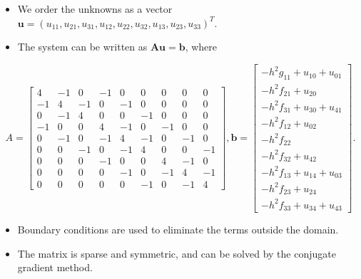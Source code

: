 \documentclass{beamer}
\newcommand{\afterverb}{\normalsize}
\begin{document}
\begin{frame}
\begin{itemize}
     \item We order the unknowns as a vector $\mathbf{u}=(u_{11}, u_{21}, u_{31}, u_{12}, u_{22}, u_{32}, u_{13}, u_{23}, u_{33})^T$.
     \item The system can be written as $\mathbf{A} \mathbf{u} = \mathbf{b}$,
    where 
\end{itemize}
    \scriptsize
    \[
        A=\left[\begin{array}{rrrrrrrrr}
            4 & -1 & 0 & -1 & 0 & 0 & 0 & 0 & 0 \\
            -1 & 4 & -1 & 0 & -1 & 0 & 0 & 0 & 0 \\
            0 & -1 & 4 & 0 & 0 & -1 & 0 & 0 & 0 \\
            -1 & 0 & 0 & 4 & -1 & 0 & -1 & 0 & 0 \\
            0 & -1 & 0 & -1 & 4 & -1 & 0 & -1 & 0 \\
            0 & 0 & -1 & 0 & -1 & 4 & 0 & 0 & -1 \\
            0 & 0 & 0 & -1 & 0 & 0 & 4 & -1 & 0 \\
            0 & 0 & 0 & 0 & -1 & 0 & -1 & 4 & -1 \\
            0 & 0 & 0 & 0 & 0 & -1 & 0 & -1 & 4
            \end{array}\right],         
            \boldsymbol{b}=\left[\begin{array}{l}
                -h^2 g_{11}+u_{10}+u_{01} \\
                -h^2 f_{21}+u_{20} \\
                -h^2 f_{31}+u_{30}+u_{41} \\
                -h^2 f_{12}+u_{02} \\
                -h^2 f_{22} \\
                -h^2 f_{32}+u_{42} \\
                -h^2 f_{13}+u_{14}+u_{03} \\
                -h^2 f_{23}+u_{24} \\
                -h^2 f_{33}+u_{34}+u_{43}
                \end{array}\right].
    \]
    \afterverb
    \begin{itemize}
        \item Boundary conditions are used to eliminate the terms outside the domain.
        \item The matrix is sparse and symmetric, and can be solved by the conjugate gradient method.
    \end{itemize}
\end{frame}
\end{document}
